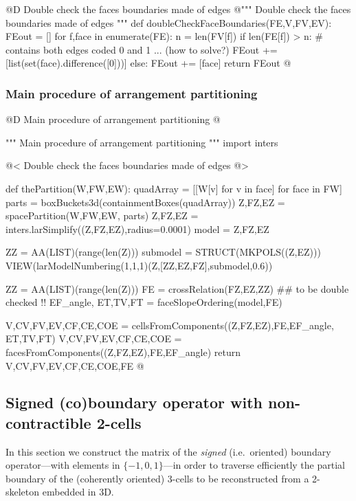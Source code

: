 \documentclass[11pt,oneside]{article}    %
\begin{document}
@D Double check the faces boundaries made of edges
@{""" Double check the faces boundaries made of edges """
def doubleCheckFaceBoundaries(FE,V,FV,EV):
    FEout = []
    for f,face in enumerate(FE):
        n = len(FV[f])
        if len(FE[f]) > n:
            # contains both edges coded 0 and 1 ... (how to solve?)
            FEout += [list(set(face).difference([0]))]
        else:
            FEout += [face]
    return FEout
@}


\subsubsection{Main procedure of arrangement partitioning}

@D Main procedure of arrangement partitioning
@{""" Main procedure of arrangement partitioning """
import inters

@< Double check the faces boundaries made of edges @>

def thePartition(W,FW,EW):
    quadArray = [[W[v] for v in face] for face in FW]
    parts = boxBuckets3d(containmentBoxes(quadArray))
    Z,FZ,EZ = spacePartition(W,FW,EW, parts)
    Z,FZ,EZ = inters.larSimplify((Z,FZ,EZ),radius=0.0001)
    model = Z,FZ,EZ

    ZZ = AA(LIST)(range(len(Z)))
    submodel = STRUCT(MKPOLS((Z,EZ)))
    VIEW(larModelNumbering(1,1,1)(Z,[ZZ,EZ,FZ],submodel,0.6)) 

    ZZ = AA(LIST)(range(len(Z)))
    FE = crossRelation(FZ,EZ,ZZ) ## to be double checked !!
    EF_angle, ET,TV,FT = faceSlopeOrdering(model,FE)
    
    V,CV,FV,EV,CF,CE,COE = cellsFromComponents((Z,FZ,EZ),FE,EF_angle, ET,TV,FT)
    V,CV,FV,EV,CF,CE,COE = facesFromComponents((Z,FZ,EZ),FE,EF_angle)
    return V,CV,FV,EV,CF,CE,COE,FE
@}


\subsection{Signed (co)boundary operator with non-contractible 2-cells}

In this section we construct the matrix of the \emph{signed} (i.e.~oriented) boundary operator---with elements in $\{-1,0,1\}$---in order to traverse efficiently the partial boundary of the (coherently oriented) 3-cells to be reconstructed from a 2-skeleton embedded in 3D.
\end{document}
